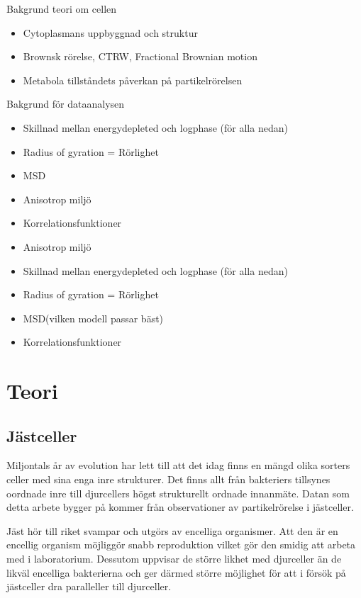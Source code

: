 

Bakgrund teori om cellen
\begin{itemize}
    \item Cytoplasmans uppbyggnad och struktur
    \item Brownsk rörelse, CTRW, Fractional Brownian motion
    \item Metabola tillståndets påverkan på partikelrörelsen
\end{itemize}
Bakgrund för dataanalysen
\begin{itemize}
    \item Skillnad mellan energydepleted och logphase (för alla nedan)
    \item Radius of gyration = Rörlighet
    \item MSD
    \item Anisotrop miljö
    \item Korrelationsfunktioner
\end{itemize}



\begin{itemize}
    \item Anisotrop miljö
    \item Skillnad mellan energydepleted och logphase (för alla nedan)
    \item Radius of gyration = Rörlighet
    \item MSD(vilken modell passar bäst)
    \item Korrelationsfunktioner
\end{itemize}



\section{Teori}

\subsection{Jästceller}

Miljontals år av evolution har lett till att det idag finns en mängd olika sorters celler med sina enga inre strukturer. Det finns allt från bakteriers tillsynes oordnade inre till djurcellers högst strukturellt ordnade innanmäte. Datan som detta arbete bygger på kommer från observationer av partikelrörelse i jästceller.

Jäst hör till riket svampar och utgörs av encelliga organismer. \cite{Yeast} Att den är en encellig organism möjliggör snabb reproduktion vilket gör den smidig att arbeta med i laboratorium. Dessutom uppvisar de större likhet med  djurceller än de likväl encelliga bakterierna och ger därmed större möjlighet för att i försök på jästceller dra paralleller till djurceller. 


